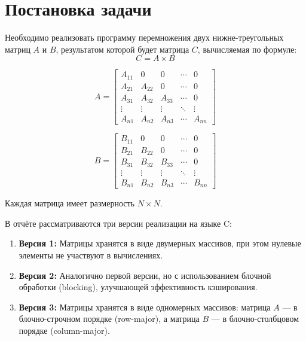 \documentclass[14pt, russian]{matmex-diploma-custom}
\begin{document}

\maketitle
\setcounter{tocdepth}{2}
\tableofcontents

\section*{Постановка задачи}
Необходимо реализовать программу перемножения двух нижне-треугольных матриц \( A \) и \( B \), результатом которой будет матрица \( C \), вычисляемая по формуле:
\begin{equation}
C = A \times B
\end{equation}

\[
A =
\begin{bmatrix}
A_{11} & 0       & 0       & \cdots & 0 \\
A_{21} & A_{22}  & 0       & \cdots & 0 \\
A_{31} & A_{32}  & A_{33}  & \cdots & 0 \\
\vdots& \vdots  & \vdots  & \ddots & \vdots \\
A_{n1} & A_{n2}  & A_{n3}  & \cdots & A_{nn}
\end{bmatrix}
\]

\[
B =
\begin{bmatrix}
B_{11} & 0       & 0       & \cdots & 0 \\
B_{21} & B_{22}  & 0       & \cdots & 0 \\
B_{31} & B_{32}  & B_{33}  & \cdots & 0 \\
\vdots& \vdots  & \vdots  & \ddots & \vdots \\
B_{n1} & B_{n2}  & B_{n3}  & \cdots & B_{nn}
\end{bmatrix}
\]

Каждая матрица имеет размерность \( N \times N \).

В отчёте рассматриваются три версии реализации на языке C:

\begin{enumerate}
    \item \textbf{Версия 1:} Матрицы хранятся в виде двумерных массивов, при этом нулевые элементы не участвуют в вычислениях.
    \item \textbf{Версия 2:} Аналогично первой версии, но с использованием блочной обработки (blocking), улучшающей эффективность кэширования.
    \item \textbf{Версия 3:} Матрицы хранятся в виде одномерных массивов: матрица \( A \) — в блочно-строчном порядке (row-major), а матрица \( B \) — в блочно-столбцовом порядке (column-major).
\end{enumerate}
\end{document}
